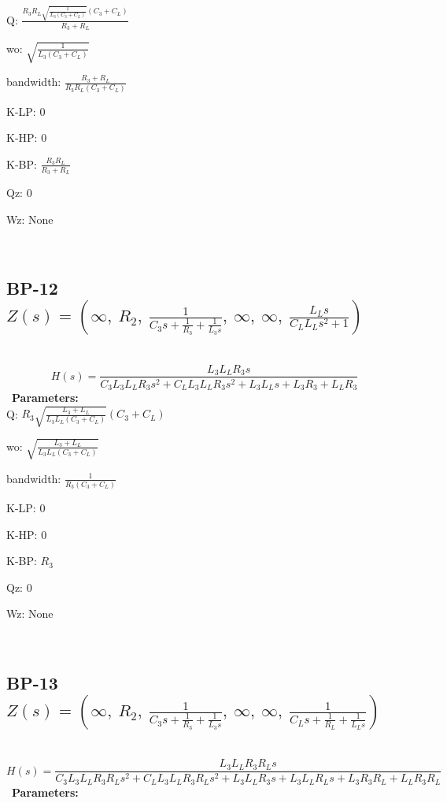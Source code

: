 \documentclass{article}
\begin{document}
Q: $\frac{R_{3} R_{L} \sqrt{\frac{1}{L_{3} \left(C_{3} + C_{L}\right)}} \left(C_{3} + C_{L}\right)}{R_{3} + R_{L}}$\ 

wo: $\sqrt{\frac{1}{L_{3} \left(C_{3} + C_{L}\right)}}$\ 

bandwidth: $\frac{R_{3} + R_{L}}{R_{3} R_{L} \left(C_{3} + C_{L}\right)}$\ 

K-LP: $0$\ 

K-HP: $0$\ 

K-BP: $\frac{R_{3} R_{L}}{R_{3} + R_{L}}$\ 

Qz: $0$\ 

Wz: $\text{None}$\ 

\ 

\subsection{BP-12 $Z(s) = \left( \infty, \  R_{2}, \  \frac{1}{C_{3} s + \frac{1}{R_{3}} + \frac{1}{L_{3} s}}, \  \infty, \  \infty, \  \frac{L_{L} s}{C_{L} L_{L} s^{2} + 1}\right)$ } \ 
\textbf{\[H(s) = \frac{L_{3} L_{L} R_{3} s}{C_{3} L_{3} L_{L} R_{3} s^{2} + C_{L} L_{3} L_{L} R_{3} s^{2} + L_{3} L_{L} s + L_{3} R_{3} + L_{L} R_{3}}\] } \ 
\textbf{Parameters:}\\ 

Q: $R_{3} \sqrt{\frac{L_{3} + L_{L}}{L_{3} L_{L} \left(C_{3} + C_{L}\right)}} \left(C_{3} + C_{L}\right)$\ 

wo: $\sqrt{\frac{L_{3} + L_{L}}{L_{3} L_{L} \left(C_{3} + C_{L}\right)}}$\ 

bandwidth: $\frac{1}{R_{3} \left(C_{3} + C_{L}\right)}$\ 

K-LP: $0$\ 

K-HP: $0$\ 

K-BP: $R_{3}$\ 

Qz: $0$\ 

Wz: $\text{None}$\ 

\ 

\subsection{BP-13 $Z(s) = \left( \infty, \  R_{2}, \  \frac{1}{C_{3} s + \frac{1}{R_{3}} + \frac{1}{L_{3} s}}, \  \infty, \  \infty, \  \frac{1}{C_{L} s + \frac{1}{R_{L}} + \frac{1}{L_{L} s}}\right)$ } \ 
\textbf{\[H(s) = \frac{L_{3} L_{L} R_{3} R_{L} s}{C_{3} L_{3} L_{L} R_{3} R_{L} s^{2} + C_{L} L_{3} L_{L} R_{3} R_{L} s^{2} + L_{3} L_{L} R_{3} s + L_{3} L_{L} R_{L} s + L_{3} R_{3} R_{L} + L_{L} R_{3} R_{L}}\] } \ 
\textbf{Parameters:}\\ 
\end{document}
